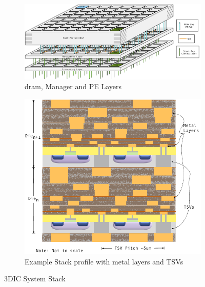 \documentclass[journal]{IEEEtran}
\begin{document}
\begin{figure}
\centering
\begin{subfigure}{.5\textwidth}
  \centering
  \includegraphics[width=1\textwidth]{SmallStackDiagram.jpg}
  \captionsetup{justification=centering, width=.8\linewidth}
  \caption{\ac{dram}, Manager and PE Layers}
  \label{fig:3DICStack}
\end{subfigure}%

\bigskip

\begin{subfigure}{.35\textwidth}
  \centering
  \includegraphics[width=1\textwidth]{TSVs.pdf}
  \captionsetup{justification=centering, width=1\linewidth}
  \caption{Example Stack profile with metal layers and TSVs \cite{itrs2015_interconn}}
  \label{fig:tsv}
\end{subfigure}
\captionsetup{justification=centering, width=.9\linewidth}
\caption{3DIC System Stack}
\label{fig:3DICStack}
\end{figure}
\end{document}
